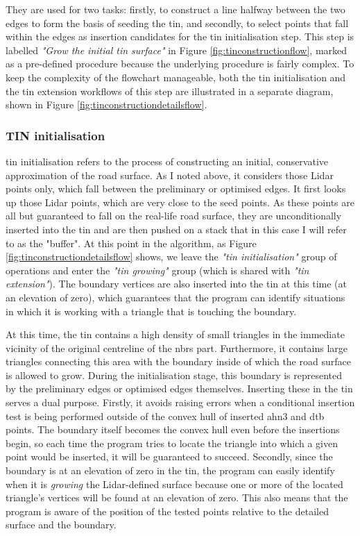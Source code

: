 They are used for two tasks: firstly, to construct a line halfway between the two edges to form the basis of seeding the \ac{tin}, and secondly, to select points that fall within the edges as insertion candidates for the \ac{tin} initialisation step. This step is labelled \textit{"Grow the initial \ac{tin} surface"} in Figure \ref{fig:tinconstructionflow}, marked as a pre-defined procedure because the underlying procedure is fairly complex. To keep the complexity of the flowchart manageable, both the \ac{tin} initialisation and the \ac{tin} extension workflows of this step are illustrated in a separate diagram, shown in Figure \ref{fig:tinconstructiondetailsflow}.

\subsubsection{TIN initialisation}

\ac{tin} initialisation refers to the process of constructing an initial, conservative approximation of the road surface. As I noted above, it considers those Lidar points only, which fall between the preliminary or optimised edges. It first looks up those Lidar points, which are very close to the seed points. As these points are all but guaranteed to fall on the real-life road surface, they are unconditionally inserted into the \ac{tin} and are then pushed on a stack that in this case I will refer to as the "buffer". At this point in the algorithm, as Figure \ref{fig:tinconstructiondetailsflow} shows, we leave the \textit{"\ac{tin} initialisation"} group of operations and enter the \textit{"\ac{tin} growing"} group (which is shared with \textit{"\ac{tin} extension"}). The boundary vertices are also inserted into the \ac{tin} at this time (at an elevation of zero), which guarantees that the program can identify situations in which it is working with a triangle that is touching the boundary.

At this time, the \ac{tin} contains a high density of small triangles in the immediate vicinity of the original centreline of the \ac{nbrs} part. Furthermore, it contains large triangles connecting this area with the boundary inside of which the road surface is allowed to grow. During the initialisation stage, this boundary is represented by the preliminary edges or optimised edges themselves. Inserting these in the \ac{tin} serves a dual purpose. Firstly, it avoids raising errors when a conditional insertion test is being performed outside of the convex hull of inserted \ac{ahn3} and \ac{dtb} points. The boundary itself becomes the convex hull even before the insertions begin, so each time the program tries to locate the triangle into which a given point would be inserted, it will be guaranteed to succeed. Secondly, since the boundary is at an elevation of zero in the \ac{tin}, the program can easily identify when it is \textit{growing} the Lidar-defined surface because one or more of the located triangle's vertices will be found at an elevation of zero. This also means that the program is aware of the position of the tested points relative to the detailed surface and the boundary.

